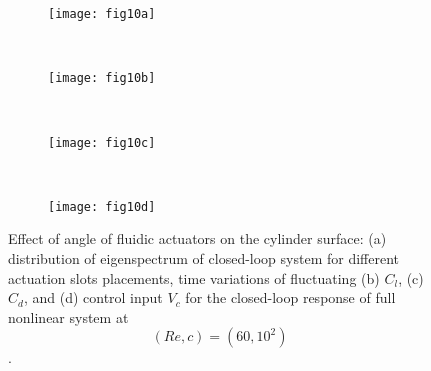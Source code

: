 \documentclass[standard]{jfm}
\begin{document}
\begin{figure}
\centering
\begin{minipage}{.4\textwidth}
  \begin{subfigure}[c]{0.47\textwidth}
\centering
  \texttt{[image: fig10a]} 
    \caption{}
    \label{fig:angle_eigvalue}
    \end{subfigure}  \\
\end{minipage} 
\begin{minipage}{.4\textwidth}
\begin{subfigure}[b]{0.4\textwidth} 
\centering
  \texttt{[image: fig10b]}
	\caption{}
	\label{fig:angle_cl}
	\end{subfigure}	\\
\begin{subfigure}[b]{0.4\textwidth} 
\centering
  \texttt{[image: fig10c]} 
	\caption{}
	\label{fig:angle_cd}
	\end{subfigure}	\\
\begin{subfigure}[b]{0.4\textwidth} 
\centering
  \texttt{[image: fig10d]}
	\caption{}
	\label{fig:angle_uc}
	\end{subfigure}				
\end{minipage}%
\caption{Effect of angle of fluidic actuators on the cylinder surface: 
         (a) distribution of eigenspectrum of closed-loop system for different actuation slots placements, 
		 time variations of fluctuating (b) $C_l$, (c) $C_d$, and (d) control input $V_c$ 
		for the closed-loop response of full nonlinear system at $$(Re,c)=(60,10^2)$$. 
                }
\end{figure} 
\end{document}
